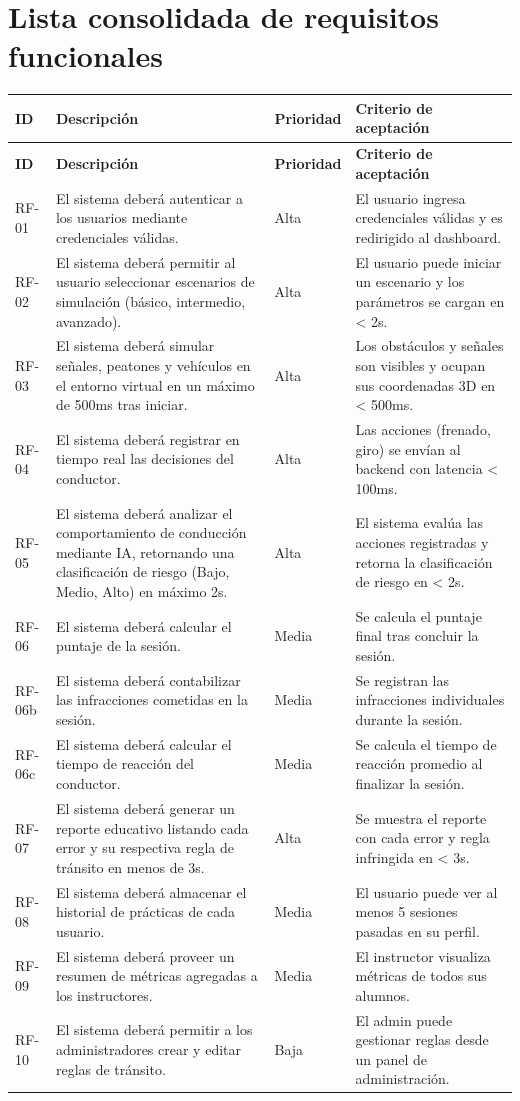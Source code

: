 \documentclass[12pt]{article}
\begin{document}
\section{Lista consolidada de requisitos funcionales}
\begin{longtable}{|p{1.5cm}|p{5cm}|p{2cm}|p{6cm}|}
\hline
\textbf{ID} & \textbf{Descripción} & \textbf{Prioridad} & \textbf{Criterio de aceptación} \\ \hline
\endfirsthead
\hline
\textbf{ID} & \textbf{Descripción} & \textbf{Prioridad} & \textbf{Criterio de aceptación} \\ \hline
\endhead
RF-01 & El sistema deberá autenticar a los usuarios mediante credenciales válidas. & Alta & El usuario ingresa credenciales válidas y es redirigido al dashboard. \\ \hline
RF-02 & El sistema deberá permitir al usuario seleccionar escenarios de simulación (básico, intermedio, avanzado). & Alta & El usuario puede iniciar un escenario y los parámetros se cargan en < 2s. \\ \hline
RF-03 & El sistema deberá simular señales, peatones y vehículos en el entorno virtual en un máximo de 500ms tras iniciar. & Alta & Los obstáculos y señales son visibles y ocupan sus coordenadas 3D en < 500ms. \\ \hline
RF-04 & El sistema deberá registrar en tiempo real las decisiones del conductor. & Alta & Las acciones (frenado, giro) se envían al backend con latencia < 100ms. \\ \hline
RF-05 & El sistema deberá analizar el comportamiento de conducción mediante IA, retornando una clasificación de riesgo (Bajo, Medio, Alto) en máximo 2s. & Alta & El sistema evalúa las acciones registradas y retorna la clasificación de riesgo en < 2s. \\ \hline
RF-06 & El sistema deberá calcular el puntaje de la sesión. & Media & Se calcula el puntaje final tras concluir la sesión. \\ \hline
RF-06b & El sistema deberá contabilizar las infracciones cometidas en la sesión. & Media & Se registran las infracciones individuales durante la sesión. \\ \hline
RF-06c & El sistema deberá calcular el tiempo de reacción del conductor. & Media & Se calcula el tiempo de reacción promedio al finalizar la sesión. \\ \hline
RF-07 & El sistema deberá generar un reporte educativo listando cada error y su respectiva regla de tránsito en menos de 3s. & Alta & Se muestra el reporte con cada error y regla infringida en < 3s. \\ \hline
RF-08 & El sistema deberá almacenar el historial de prácticas de cada usuario. & Media & El usuario puede ver al menos 5 sesiones pasadas en su perfil. \\ \hline
RF-09 & El sistema deberá proveer un resumen de métricas agregadas a los instructores. & Media & El instructor visualiza métricas de todos sus alumnos. \\ \hline
RF-10 & El sistema deberá permitir a los administradores crear y editar reglas de tránsito. & Baja & El admin puede gestionar reglas desde un panel de administración. \\ \hline
\end{longtable}
\end{document}
